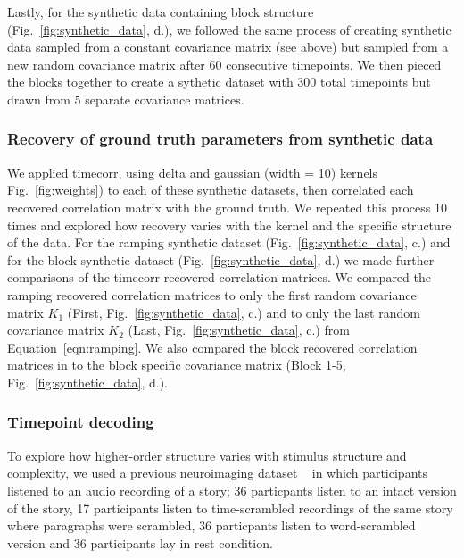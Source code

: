 \documentclass[english]{article}
\begin{document}
Lastly, for the synthetic data containing block structure (Fig.~\ref{fig:synthetic_data},  d.), we followed the same
process of creating synthetic data sampled from a constant covariance
matrix (see above) but sampled from a new random covariance matrix
after 60 consecutive timepoints.  We then pieced the blocks together
to create a sythetic dataset with 300 total timepoints but drawn from
5 separate covariance matrices. 

\subsubsection*{Recovery of ground truth parameters from synthetic
  data}


We applied timecorr, using delta and gaussian (width = 10) kernels
Fig.~\ref{fig:weights}) to each of these 
synthetic datasets, then correlated each recovered
correlation matrix with the ground truth.  We repeated this process 10
times and explored how recovery varies
with the kernel and the specific structure of the data. For the
ramping synthetic dataset (Fig.~\ref{fig:synthetic_data},  c.)  and for the
block synthetic dataset (Fig.~\ref{fig:synthetic_data},  d.)  we made further
comparisons of the timecorr recovered correlation matrices. We
compared the ramping recovered correlation matrices to only the first random covariance matrix $K_{1}$
(First, Fig.~\ref{fig:synthetic_data},  c.) and to only the last
random covariance matrix $K_{2}$ (Last, Fig.~\ref{fig:synthetic_data},
c.) from Equation~\ref{eqn:ramping}. We also compared the block recovered correlation matrices in to
the block specific covariance matrix (Block 1-5,
Fig.~\ref{fig:synthetic_data},  d.).


\subsubsection*{Timepoint decoding}

To explore how higher-order structure varies with stimulus structure
and complexity, we used a previous neuroimaging dataset
~\cite{SimoEtal16}  in which participants listened to an audio recording of a story; 36 particpants listen to an intact version of the story, 17 participants listen to time-scrambled recordings of the same story where paragraphs were scrambled, 36 particpants listen to word-scrambled version and 36 participants lay in rest condition.
\end{document}
